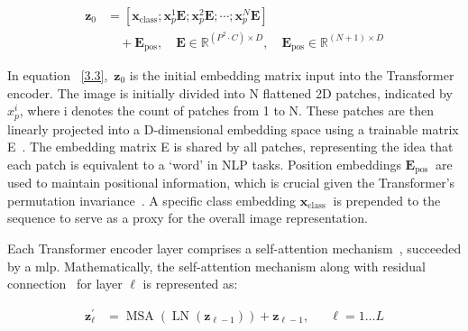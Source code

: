 \begin{equation}
\begin{aligned}
\mathbf{z}_0 & =\left[\mathbf{x}_{\text {class}} ; \mathbf{x}_p^1 \mathbf{E} ; \mathbf{x}_p^2 \mathbf{E} ; \cdots ; \mathbf{x}_p^N \mathbf{E}\right] \\
& \quad +\mathbf{E}_{\text {pos}}, \quad \mathbf{E} \in \mathbb{R}^{\left(P^2 \cdot C\right) \times D}, \quad
\mathbf{E}_{\text {pos}} \in \mathbb{R}^{(N+1) \times D}
\end{aligned}
\label{3.3}
\end{equation}


In equation ~\ref{3.3},~$\mathbf{z}_0$ is the initial embedding matrix input into the Transformer encoder. The image is initially divided into N flattened 2D patches, indicated by $x_{p}^{i}$, where i denotes the count of patches from 1 to N. These patches are then linearly projected into a D-dimensional embedding space using a trainable matrix E~\citep{Vit_Paper_Dosovitskiy2020AnII}. The embedding matrix E is shared by all patches, representing the idea that each patch is equivalent to a `word' in NLP tasks. Position embeddings $\mathbf{E}_{\text {pos }}$ are used to maintain positional information, which is crucial given the Transformer's permutation invariance~\citep{Vit_Paper_Dosovitskiy2020AnII}. A specific class embedding $\mathbf{x}_{\text {class }}$ is prepended to the sequence to serve as a proxy for the overall image representation.


Each Transformer encoder layer comprises a self-attention mechanism~\cite{Vaswani2017AttentionIA}, succeeded by a \gls{mlp}. Mathematically, the self-attention mechanism along with residual connection~\citep{residual_connection_he2016deep} for layer $\ell$ is represented as:

\begin{equation}
\begin{aligned}
\mathbf{z}_{\ell}^{\prime} & =\operatorname{MSA}\left(\operatorname{LN}\left(\mathbf{z}_{\ell-1}\right)\right)+\mathbf{z}_{\ell-1}, & & \ell=1 \ldots L \\
\end{aligned}
\label{3.4}
\end{equation}


